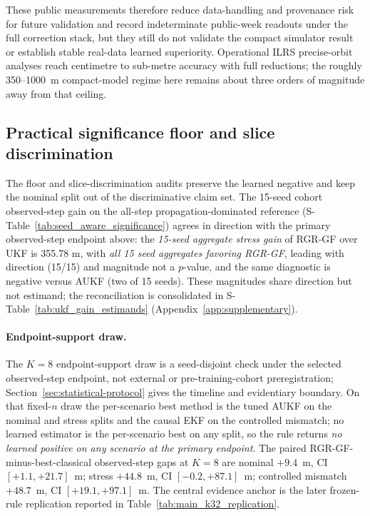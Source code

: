 \documentclass{article}
\begin{document}
These public measurements therefore reduce data-handling and provenance risk for future validation and record indeterminate public-week readouts under the full correction stack, but they still do not validate the compact simulator result or establish stable real-data learned superiority. Operational ILRS precise-orbit analyses reach centimetre to sub-metre accuracy with full reductions; the roughly 350--1000~m compact-model regime here remains about three orders of magnitude away from that ceiling.

\subsection{Practical significance floor and slice discrimination}
The floor and slice-discrimination audits preserve the learned negative and keep the nominal split out of the discriminative claim set.
The 15-seed cohort observed-step gain on the all-step propagation-dominated reference (S-Table~\ref{tab:seed_aware_significance}) agrees in direction with the primary observed-step endpoint above: the \emph{15-seed aggregate stress gain} of RGR-GF over UKF is 355.78 m, with \emph{all 15 seed aggregates favoring RGR-GF}, leading with direction (15/15) and magnitude not a \(p\)-value, and the same diagnostic is negative versus AUKF (two of 15 seeds). These magnitudes share direction but not estimand; the reconciliation is consolidated in S-Table~\ref{tab:ukf_gain_estimands} (Appendix~\ref{app:supplementary}).

\paragraph{Endpoint-support draw.}
The $K=8$ endpoint-support draw is a seed-disjoint check under the selected observed-step endpoint, not external or pre-training-cohort preregistration; Section~\ref{sec:statistical-protocol} gives the timeline and evidentiary boundary. On that fixed-$n$ draw the per-scenario best method is the tuned AUKF on the nominal and stress splits and the causal EKF on the controlled mismatch; no learned estimator is the per-scenario best on any split, so the rule returns \emph{no learned positive on any scenario at the primary endpoint}. The paired RGR-GF-minus-best-classical observed-step gaps at $K=8$ are nominal $+9.4$~m, CI $[+1.1, +21.7]$~m; stress $+44.8$~m, CI $[-0.2, +87.1]$~m; controlled mismatch $+48.7$~m, CI $[+19.1, +97.1]$~m. The central evidence anchor is the later frozen-rule replication reported in Table~\ref{tab:main_k32_replication}.
\end{document}
